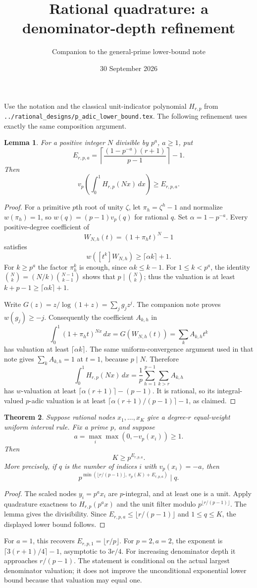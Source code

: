 \documentclass[11pt]{article}
\title{Rational quadrature: a denominator-depth refinement}
\author{Companion to the general-prime lower-bound note}
\date{30 September 2026}
\newtheorem{theorem}{Theorem}
\newtheorem{lemma}[theorem]{Lemma}
\begin{document}
\maketitle

Use the notation and the classical unit-indicator polynomial $H_{r,p}$
from \texttt{../rational\_designs/p\_adic\_lower\_bound.tex}.
The following refinement uses exactly the same composition argument.

\begin{lemma}
For a positive integer $N$ divisible by $p^a$, $a\ge1$, put
\[
 E_{r,p,a}=\left\lceil
       \frac{(1-p^{-a})(r+1)}{p-1}\right\rceil-1.
\]
Then
\[
 v_p\left(\int_0^1H_{r,p}(Nx)\,dx\right)\ge E_{r,p,a}.
\]
\end{lemma}
\begin{proof}
For a primitive $p$th root of unity $\zeta$, let
$\pi_h=\zeta^h-1$ and normalize $w(\pi_h)=1$, so
$w(q)=(p-1)v_p(q)$ for rational $q$. Set $\alpha=1-p^{-a}$.
Every positive-degree coefficient of
\[
 W_{N,h}(t)=(1+\pi_h t)^N-1
\]
satisfies
\[
 w([t^k]W_{N,h})\ge\lceil\alpha k\rceil+1.
\]
For $k\ge p^a$ the factor $\pi_h^k$ is enough, since
$\alpha k\le k-1$. For $1\le k<p^a$, the identity
$\binom Nk=(N/k)\binom{N-1}{k-1}$ shows that $p\mid\binom Nk$;
thus the valuation is at least $k+p-1\ge\lceil\alpha k\rceil+1$.

Write $G(z)=z/\log(1+z)=\sum_jg_jz^j$. The companion note proves
$w(g_j)\ge-j$. Consequently the coefficient $A_{k,h}$ in
\[
 \int_0^1(1+\pi_h t)^{Nx}\,dx
   =G(W_{N,h}(t))=\sum_kA_{k,h}t^k
\]
has valuation at least $\lceil\alpha k\rceil$.
The same uniform-convergence argument used in that note gives
$\sum_kA_{k,h}=1$ at $t=1$, because $p\mid N$.
Therefore
\[
 \int_0^1H_{r,p}(Nx)\,dx
   =\frac1p\sum_{h=1}^{p-1}\sum_{k>r}A_{k,h}
\]
has $w$-valuation at least $\lceil\alpha(r+1)\rceil-(p-1)$.
It is rational, so its integral-valued $p$-adic valuation is at least
$\lceil\alpha(r+1)/(p-1)\rceil-1$, as claimed.
\end{proof}

\begin{theorem}
Suppose rational nodes $x_1,\ldots,x_K$ give a degree-$r$ equal-weight
uniform interval rule. Fix a prime $p$, and suppose
\[
 a=\max_i\max(0,-v_p(x_i))\ge1.
\]
Then
\[
 K\ge p^{E_{r,p,a}}.
\]
More precisely, if $q$ is the number of indices $i$ with
$v_p(x_i)=-a$, then
\[
 p^{\min(\lfloor r/(p-1)\rfloor,\ v_p(K)+E_{r,p,a})}\mid q.
\]
\end{theorem}
\begin{proof}
The scaled nodes $y_i=p^a x_i$ are $p$-integral, and at least one is a
unit. Apply quadrature exactness to $H_{r,p}(p^a x)$ and the unit filter
modulo $p^{\lfloor r/(p-1)\rfloor}$. The lemma gives the divisibility.
Since $E_{r,p,a}\le\lfloor r/(p-1)\rfloor$ and $1\le q\le K$,
the displayed lower bound follows.
\end{proof}

For $a=1$, this recovers $E_{r,p,1}=\lfloor r/p\rfloor$.
For $p=2,a=2$, the exponent is
$\lceil3(r+1)/4\rceil-1$, asymptotic to $3r/4$.
For increasing denominator depth it approaches $r/(p-1)$.
The statement is conditional on the actual largest denominator valuation;
it does not improve the unconditional exponential lower bound because
that valuation may equal one.
\end{document}
